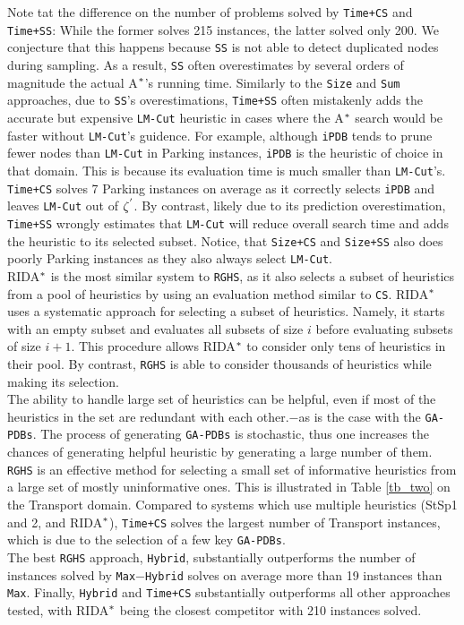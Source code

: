 Note tat the difference on the number of problems solved by \texttt{Time+CS} and \texttt{Time+SS}: While the former solves 215 instances, the latter solved only 200. We conjecture that this happens because \texttt{SS} is not able to detect duplicated nodes during sampling. As a result, \texttt{SS} often overestimates by several orders of magnitude the actual A$\sp{*}$'s running time. Similarly to the \texttt{Size} and \texttt{Sum} approaches, due to \texttt{SS}'s overestimations, \texttt{Time+SS} often mistakenly adds the accurate but expensive \texttt{LM-Cut} heuristic in cases where the A$\sp{*}$ search would be faster without \texttt{LM-Cut}'s guidence. For example, although \texttt{iPDB} tends to prune fewer nodes than \texttt{LM-Cut} in Parking instances, \texttt{iPDB} is the heuristic of choice in that domain. This is because its evaluation time is much smaller than \texttt{LM-Cut}'s. \texttt{Time+CS} solves 7 Parking instances on average as it correctly selects \texttt{iPDB} and leaves \texttt{LM-Cut} out of $\zeta\sp{'}$. By contrast, likely due to its prediction overestimation, \texttt{Time+SS} wrongly estimates that \texttt{LM-Cut} will reduce overall search time and adds the heuristic to its selected subset. Notice, that \texttt{Size+CS} and \texttt{Size+SS} also does poorly Parking instances as they also always select \texttt{LM-Cut}.\\

RIDA$\sp{*}$ is the most similar system to \texttt{RGHS}, as it also selects a subset of heuristics from a pool of heuristics by using an evaluation method similar to \texttt{CS}. RIDA$\sp{*}$ uses a systematic approach for selecting a subset of heuristics. Namely, it starts with an empty subset and evaluates all subsets of size $i$ before evaluating subsets of size $i+1$. This procedure allows RIDA$\sp{*}$ to consider only tens of heuristics in their pool. By contrast, \texttt{RGHS} is able to consider thousands of heuristics while making its selection.\\

The ability to handle large set of heuristics can be helpful, even if most of the heuristics in the set are redundant with each other.$-$as is the case with the \texttt{GA-PDBs}. The process of generating \texttt{GA-PDBs} is stochastic, thus one increases the chances of generating helpful heuristic by generating a large number of them. \texttt{RGHS} is an effective method for selecting a small set of informative heuristics from a large set of mostly uninformative ones. This is illustrated in Table \ref{tb_two} on the Transport domain. Compared to systems which use multiple heuristics (StSp1 and 2, and RIDA$\sp{*}$), \texttt{Time+CS} solves the largest number of Transport instances, which is due to the selection of a few key \texttt{GA-PDBs}.\\

The best \texttt{RGHS} approach, \texttt{Hybrid}, substantially outperforms the number of instances solved by \texttt{Max$-$Hybrid} solves on average more than 19 instances than \texttt{Max}. Finally, \texttt{Hybrid} and \texttt{Time+CS} substantially outperforms all other approaches tested, with RIDA$\sp{*}$ being the closest competitor with 210 instances solved.

\clearpage
